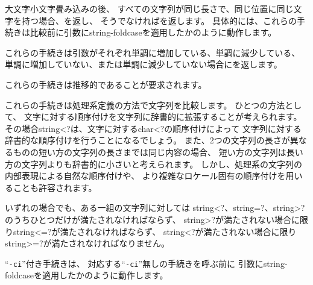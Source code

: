 \begin{entry}{%
}

大文字小文字畳み込みの後、
すべての文字列が同じ長さで、同じ位置に同じ文字を持つ場合、\schtrue{}を返し、
そうでなければ\schfalse{}を返します。
具体的には、これらの手続きは比較前に引数に{\cf string-foldcase}を適用したかのように動作します。

\end{entry}


\begin{entry}{%
}

これらの手続きは引数がそれぞれ単調に増加している、単調に減少している、
単調に増加していない、または単調に減少していない場合に\schtrue{}を返します。

これらの手続きは推移的であることが要求されます。

これらの手続きは処理系定義の方法で文字列を比較します。
ひとつの方法として、
文字に対する順序付けを文字列に辞書的に拡張することが考えられます。
その場合{\cf string<?}は、文字に対する{\cf char<?}の順序付けによって
文字列に対する辞書的な順序付けを行うことになるでしょう。
また、2つの文字列の長さが異なるものの短い方の文字列の長さまでは同じ内容の場合、
短い方の文字列は長い方の文字列よりも辞書的に小さいと考えられます。
しかし、処理系の文字列の内部表現による自然な順序付けや、
より複雑なロケール固有の順序付けを用いることも許容されます。

いずれの場合でも、ある一組の文字列に対しては
{\cf string<?}、{\cf string=?}、{\cf string>?}
のうちひとつだけが満たされなければならず、
{\cf string>?}が満たされない場合に限り{\cf string<=?}が満たされなければならず、
{\cf string<?}が満たされない場合に限り{\cf string>=?}が満たされなければなりません。

\hbox{``{\tt -ci}''}付き手続きは、
対応する\hbox{``{\tt -ci}''}無しの手続きを呼ぶ前に
引数に{\cf string-foldcase}を適用したかのように動作します。


\end{entry}

